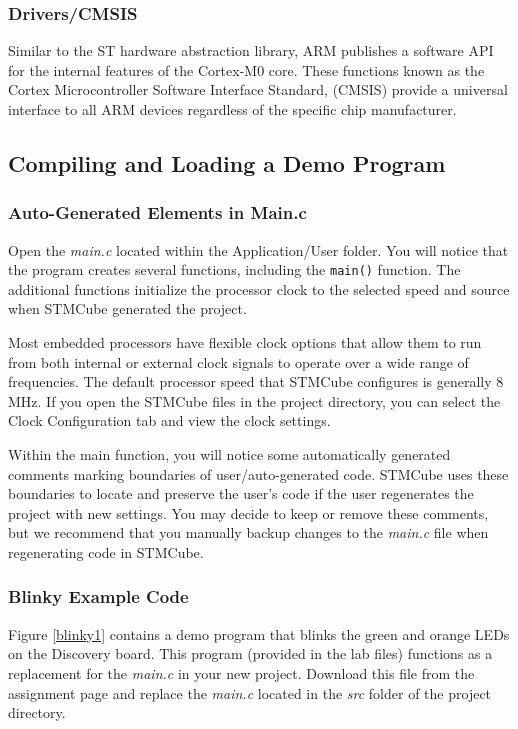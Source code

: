 \documentclass[openany,11pt,fleqn]{book} %
\begin{document}
\subsubsection*{Drivers/CMSIS}
Similar to the ST hardware abstraction library, ARM publishes a software API for the internal features of the Cortex-M0 core. These functions known as the Cortex Microcontroller Software Interface Standard, (CMSIS) provide a universal interface to all ARM devices regardless of the specific chip manufacturer. 

\subsection{\color{orange}Compiling and Loading a Demo Program }
\subsubsection{Auto-Generated Elements in Main.c}
Open the \textit{main.c} located within the Application/User folder. You will notice that the program creates several functions, including the  \texttt{main()} function. The additional functions initialize the processor clock to the selected speed and source when STMCube generated the project. 

Most embedded processors have flexible clock options that allow them to run from both internal or external clock signals to operate over a wide range of frequencies. The default processor speed that STMCube configures is generally 8 MHz. If you open the STMCube files in the project directory, you can select the Clock Configuration tab and view the clock settings.

Within the main function, you will notice some automatically generated comments marking boundaries of user/auto-generated code. STMCube uses these boundaries to locate and preserve the user's code if the user regenerates the project with new settings. You may decide to keep or remove these comments, but we recommend that you manually backup changes to the \textit{main.c} file when regenerating code in STMCube. 

\subsubsection{\color{orange}Blinky Example Code}
Figure \ref{blinky1} contains a demo program that blinks the green and orange LEDs on the Discovery board. This program (provided in the lab files) functions as a replacement for the \textit{main.c} in your new project. Download this file from the assignment page and replace the \textit{main.c} located in the \textit{src} folder of the project directory. 
\end{document}
